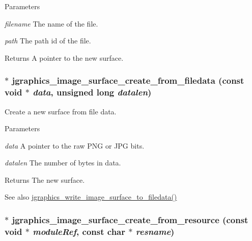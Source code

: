 \begin{DoxyParams}{Parameters}
\item[{\em filename}]The name of the file. \item[{\em path}]The path id of the file. \end{DoxyParams}
\begin{DoxyReturn}{Returns}
A pointer to the new surface. 
\end{DoxyReturn}
\hypertarget{group__jsurface_ga47be6691ef1b94e86e7783e7ce38ebe9}{
\subsubsection[{jgraphics\_\-image\_\-surface\_\-create\_\-from\_\-filedata}]{$\ast$ jgraphics\_\-image\_\-surface\_\-create\_\-from\_\-filedata (const void $\ast$ {\em data}, \/  unsigned long {\em datalen})}}
\label{group__jsurface_ga47be6691ef1b94e86e7783e7ce38ebe9}


Create a new surface from file data. 
\begin{DoxyParams}{Parameters}
\item[{\em data}]A pointer to the raw PNG or JPG bits. \item[{\em datalen}]The number of bytes in data. \end{DoxyParams}
\begin{DoxyReturn}{Returns}
The new surface. 
\end{DoxyReturn}
\begin{DoxySeeAlso}{See also}
\hyperlink{group__jsurface_ga96f2b8270e4fba3f2438ff829dc0279b}{jgraphics\_\-write\_\-image\_\-surface\_\-to\_\-filedata()} 
\end{DoxySeeAlso}
\hypertarget{group__jsurface_gabb5d09a9d36912e1685bad2799992117}{
\subsubsection[{jgraphics\_\-image\_\-surface\_\-create\_\-from\_\-resource}]{$\ast$ jgraphics\_\-image\_\-surface\_\-create\_\-from\_\-resource (const void $\ast$ {\em moduleRef}, \/  const char $\ast$ {\em resname})}}
\label{group__jsurface_gabb5d09a9d36912e1685bad2799992117}


